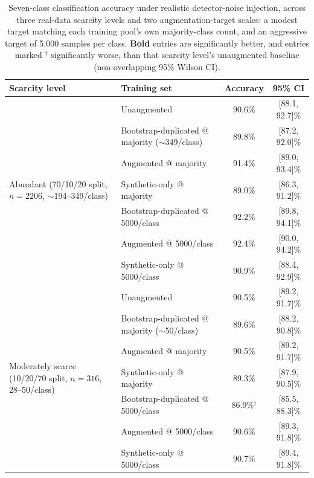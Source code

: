 \documentclass[reprint,nofootinbib,amsmath,amssymb,aps,floatfix]{revtex4-2}
\begin{document}
\begin{table}[t]
\centering
\caption{Seven-class classification accuracy under realistic detector-noise injection, across three real-data scarcity levels and two augmentation-target scales: a modest target matching each training pool's own majority-class count, and an aggressive target of 5{,}000 samples per class. \textbf{Bold} entries are significantly better, and entries marked $^\dagger$ significantly worse, than that scarcity level's unaugmented baseline (non-overlapping 95\% Wilson CI).}
\label{tab:fewshot_augmentation}
\begin{tabular}{llcc}
\toprule
Scarcity level & Training set & Accuracy & 95\% CI \\
\midrule
\multirow{7}{*}{Abundant (70/10/20 split, $n=2206$, $\sim$194--349/class)}
 & Unaugmented                                          & 90.6\% & [88.1, 92.7]\% \\
 & Bootstrap-duplicated @ majority ($\sim$349/class)     & 89.8\% & [87.2, 92.0]\% \\
 & Augmented @ majority                                 & 91.4\% & [89.0, 93.4]\% \\
 & Synthetic-only @ majority                             & 89.0\% & [86.3, 91.2]\% \\
 & Bootstrap-duplicated @ 5000/class                     & 92.2\% & [89.8, 94.1]\% \\
 & Augmented @ 5000/class                                & 92.4\% & [90.0, 94.2]\% \\
 & Synthetic-only @ 5000/class                           & 90.9\% & [88.4, 92.9]\% \\
\midrule
\multirow{7}{*}{Moderately scarce (10/20/70 split, $n=316$, 28--50/class)}
 & Unaugmented                                          & 90.5\% & [89.2, 91.7]\% \\
 & Bootstrap-duplicated @ majority ($\sim$50/class)      & 89.6\% & [88.2, 90.8]\% \\
 & Augmented @ majority                                 & 90.5\% & [89.2, 91.7]\% \\
 & Synthetic-only @ majority                             & 89.3\% & [87.9, 90.5]\% \\
 & Bootstrap-duplicated @ 5000/class                     & 86.9\%$^\dagger$ & [85.5, 88.3]\% \\
 & Augmented @ 5000/class                                & 90.6\% & [89.3, 91.8]\% \\
 & Synthetic-only @ 5000/class                           & 90.7\% & [89.4, 91.8]\% \\

\end{tabular}
\end{table}
\end{document}
